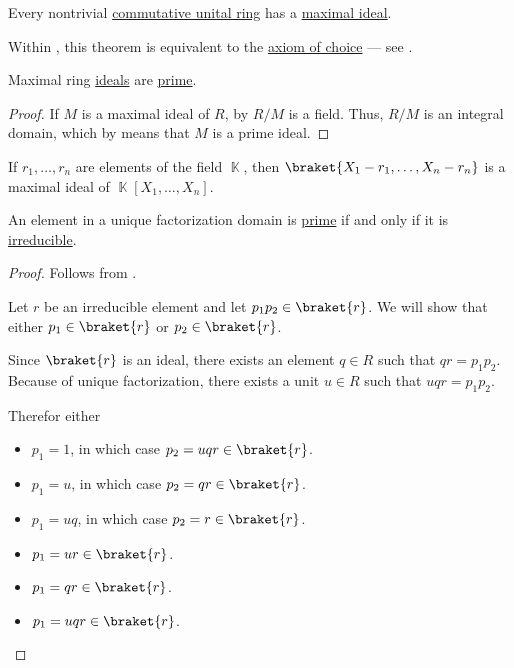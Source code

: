 \begin{theorem}\label{thm:krulls_theorem}
  Every nontrivial \hyperref[def:ring/commutative]{commutative unital ring} has a \hyperref[def:maximal_ring_ideal]{maximal ideal}.

  Within \hyperref[def:zfc]{}, this theorem is equivalent to the \hyperref[def:zfc/choice]{axiom of choice} --- see .
\end{theorem}

\begin{proposition}\label{thm:maximal_ideals_are_prime}
  Maximal ring \hyperref[def:maximal_ring_ideal]{ideals} are \hyperref[def:prime_ring_ideal]{prime}.
\end{proposition}
\begin{proof}
  If \( M \) is a maximal ideal of \( R \), by  \( R / M \) is a field. Thus, \( R / M \) is an integral domain, which by  means that \( M \) is a prime ideal.
\end{proof}

\begin{proposition}\label{thm:field_maximal_ideal_representation}
  If \( r_1, \ldots, r_n \) are elements of the field \( \BbbK \), then \( \braket{X_1 - r_1, \ldots, X_n - r_n} \) is a maximal ideal of \( \BbbK[X_1, \ldots, X_n] \).
\end{proposition}

\begin{proposition}\label{thm:ufd_prime_iff_irreducible}
  An element in a unique factorization domain is \hyperref[def:prime_ring_ideal]{prime} if and only if it is \hyperref[def:irreducible_ring_element]{irreducible}.
\end{proposition}
\begin{proof}
  \SufficiencySubProof Follows from .

  \NecessitySubProof Let \( r \) be an irreducible element and let \( p_1 p_2 \in \braket{r} \). We will show that either  \( p_1 \in \braket{r} \) or \( p_2 \in \braket{r} \).

  Since \( \braket{r} \) is an ideal, there exists an element \( q \in R \) such that \( qr = p_1 p_2 \). Because of unique factorization, there exists a unit \( u \in R \) such that \( uqr = p_1 p_2  \).

  Therefor either
  \begin{itemize}
    \item \( p_1 = 1 \), in which case \( p_2 = uqr \in \braket{r} \).
    \item \( p_1 = u \), in which case \( p_2 = qr \in \braket{r} \).
    \item \( p_1 = uq \), in which case \( p_2 = r \in \braket{r} \).
    \item \( p_1 = ur \in \braket{r} \).
    \item \( p_1 = qr \in \braket{r} \).
    \item \( p_1 = uqr \in \braket{r} \).
  \end{itemize}
\end{proof}

